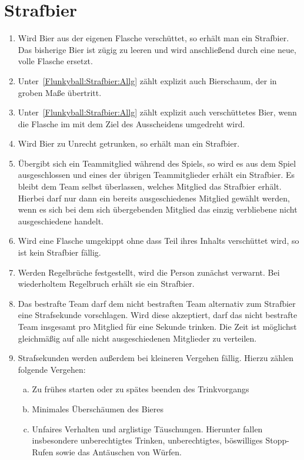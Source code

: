 \section{Strafbier}
\begin{enumerate}[label={(\arabic*)}]
    \item\label{Flunkyball:Strafbier:Allg}
    Wird Bier aus der eigenen Flasche verschüttet, so erhält man ein Strafbier.
    Das bisherige Bier ist zügig zu leeren und wird anschließend durch eine neue, volle Flasche ersetzt.

    \item
    Unter~\ref{Flunkyball:Strafbier:Allg} zählt explizit auch Bierschaum, der in groben Maße übertritt.

    \item
    Unter~\ref{Flunkyball:Strafbier:Allg} zählt explizit auch verschüttetes Bier, wenn die Flasche im mit dem Ziel des Ausscheidens umgedreht wird.

    \item
    Wird Bier zu Unrecht getrunken, so erhält man ein Strafbier.

    \item
    Übergibt sich ein Teammitglied während des Spiels, so wird es aus dem Spiel ausgeschlossen und eines der übrigen Teammitglieder erhält ein Strafbier.
    Es bleibt dem Team selbst überlassen, welches Mitglied das Strafbier erhält.
    Hierbei darf nur dann ein bereits ausgeschiedenes Mitglied gewählt werden, wenn es sich bei dem sich übergebenden Mitglied das einzig verbliebene nicht ausgeschiedene handelt.

    \item
    Wird eine Flasche umgekippt ohne dass Teil ihres Inhalts verschüttet wird, so ist kein Strafbier fällig.

    \item
    Werden Regelbrüche festgestellt, wird die Person zunächst verwarnt.
    Bei wiederholtem Regelbruch erhält sie ein Strafbier.

    \item
    Das bestrafte Team darf dem nicht bestraften Team alternativ zum Strafbier eine Strafsekunde vorschlagen.
    Wird diese akzeptiert, darf das nicht bestrafte Team insgesamt pro Mitglied für eine Sekunde trinken.
    Die Zeit ist möglichst gleichmäßig auf alle nicht ausgeschiedenen Mitglieder zu verteilen.

    \item
    Strafsekunden werden außerdem bei kleineren Vergehen fällig.
    Hierzu zählen folgende Vergehen:
    \begin{enumerate}[a.]
        \item
        Zu frühes starten oder zu spätes beenden des Trinkvorgangs
        \item
        Minimales Überschäumen des Bieres
        \item
        Unfaires Verhalten und arglistige Täuschungen.
        Hierunter fallen insbesondere unberechtigtes Trinken, unberechtigtes, böswilliges \glqq{} Stopp\grqq{}-Rufen sowie das Antäuschen von Würfen.
    \end{enumerate}
\end{enumerate}
